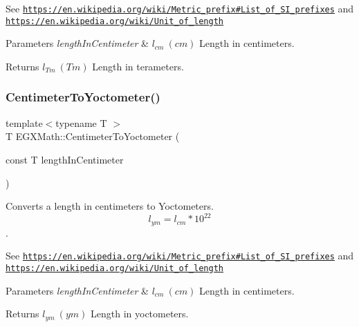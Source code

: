 See \href{https://en.wikipedia.org/wiki/Metric_prefix#List_of_SI_prefixes}{\tt https\+://en.\+wikipedia.\+org/wiki/\+Metric\+\_\+prefix\#\+List\+\_\+of\+\_\+\+S\+I\+\_\+prefixes} and \href{https://en.wikipedia.org/wiki/Unit_of_length}{\tt https\+://en.\+wikipedia.\+org/wiki/\+Unit\+\_\+of\+\_\+length} 
\begin{DoxyParams}{Parameters}
{\em length\+In\+Centimeter} & $ l_{cm}\ (cm)$ Length in centimeters. \\
\hline
\end{DoxyParams}
\begin{DoxyReturn}{Returns}
$ l_{Tm}\ (Tm)$ Length in terameters. 
\end{DoxyReturn}
\mbox{\label{group___e_g_x_math-_conversions-_length_conversions-_centimeter-_s_i_ga251be5adc836253a22a995d9f2ce6782}} 
\subsubsection{\texorpdfstring{Centimeter\+To\+Yoctometer()}{CentimeterToYoctometer()}}
{\footnotesize\ttfamily template$<$typename T $>$ \\
T E\+G\+X\+Math\+::\+Centimeter\+To\+Yoctometer (\begin{DoxyParamCaption}\item[{const T}]{length\+In\+Centimeter }\end{DoxyParamCaption})}



Converts a length in centimeters to Yoctometers. \[ l_{ym}=l_{cm} * 10^{22} \]. 

See \href{https://en.wikipedia.org/wiki/Metric_prefix#List_of_SI_prefixes}{\tt https\+://en.\+wikipedia.\+org/wiki/\+Metric\+\_\+prefix\#\+List\+\_\+of\+\_\+\+S\+I\+\_\+prefixes} and \href{https://en.wikipedia.org/wiki/Unit_of_length}{\tt https\+://en.\+wikipedia.\+org/wiki/\+Unit\+\_\+of\+\_\+length} 
\begin{DoxyParams}{Parameters}
{\em length\+In\+Centimeter} & $ l_{cm}\ (cm)$ Length in centimeters. \\
\hline
\end{DoxyParams}
\begin{DoxyReturn}{Returns}
$ l_{ym}\ (ym)$ Length in yoctometers. 
\end{DoxyReturn}
\mbox{\label{group___e_g_x_math-_conversions-_length_conversions-_centimeter-_s_i_gace13ddc9d41561595a03d858577763c3}} 

